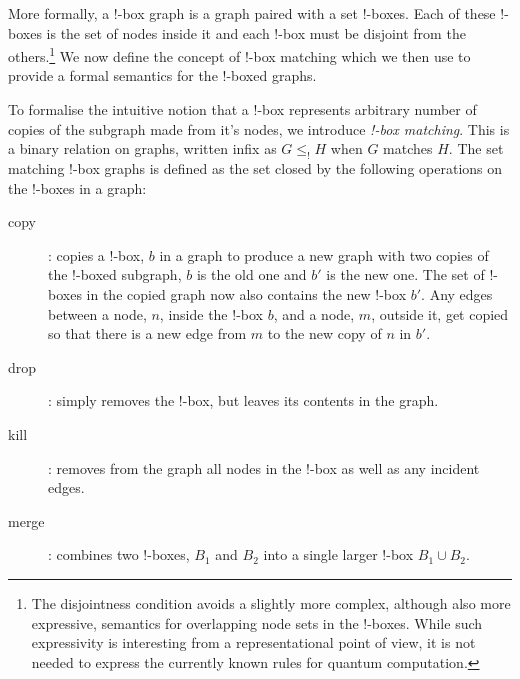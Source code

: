 \documentclass[runningheads]{llncs}
\newcommand{\inlinegraphic}[2]{
  \dimendef\grafheight=255\dimendef\grafvshift=254
  \grafheight=#1
  \grafvshift=-0.5\grafheight
  \advance\grafvshift by 0.5ex
  \raisebox{\grafvshift}{\texttt{[image: images/\#2]}\xspace}
}
\begin{document}



More formally, a !-box graph is a graph paired with a set !-boxes. Each
of these !-boxes is the set of nodes inside it and each !-box must be
disjoint from the others.\footnote{The disjointness condition avoids a
  slightly more complex, although also more expressive, semantics for
  overlapping node sets in the !-boxes. While such expressivity is
  interesting from a representational point of view, it is not needed
  to express the currently known rules for quantum computation.}  We
now define the concept of !-box matching which we then use to provide
a formal semantics for the !-boxed graphs.

To formalise the intuitive notion that a !-box
represents arbitrary number of copies of the subgraph made from it's
nodes, we introduce \emph{!-box matching}. This is a binary relation
on graphs, written infix as $G \leq_! H$ when $G$ matches $H$. The set
matching !-box graphs is defined as the set closed by the following
operations on the !-boxes in a graph:

\begin{description}
  \item[copy]: copies a !-box, $b$ in a graph to produce a new graph
  with two copies of the !-boxed subgraph, $b$ is the old one and $b'$
  is the new one. The set of !-boxes in the copied graph now also
  contains the new !-box $b'$. Any edges between a node, $n$, inside
  the !-box $b$, and a node, $m$, outside it, get copied so that there
  is a new edge from $m$ to the new copy of $n$ in $b'$.

\item[drop]: simply removes the !-box, but leaves its contents in the
  graph.

\item[kill]: removes from the graph all nodes in the !-box as well as
  any incident edges.

\item[merge]: combines two !-boxes, $B_1$ and $B_2$ into a single
  larger !-box $B_1 \cup B_2$.
\end{description}
\end{document}
